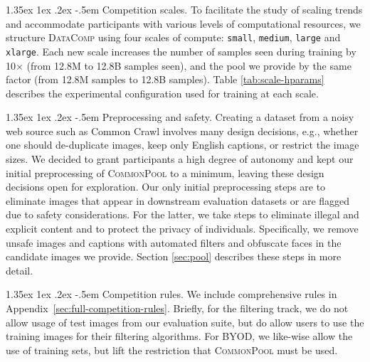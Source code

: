 \documentclass[dvipsnames,11pt]{article}
\makeatletter
\renewcommand\paragraph{\@startsection{paragraph}{4}{\z@}                                     {1.35ex \@plus1ex \@minus.2ex}                                {-.5em}
{\normalfont\normalsize\bfseries}}
\newcommand{\datanet}{\textsc{DataComp}\xspace}
\newcommand{\byod}{\textsc{BYOD}\xspace}
\newcommand{\pool}{\textsc{CommonPool}\xspace}
\makeatother
\begin{document}
\paragraph{Competition scales.} To facilitate the study of scaling trends and accommodate participants with various levels of computational resources, we structure \datanet using four scales of compute: {\small \texttt{small}}, {\small \texttt{medium}}, {\small \texttt{large}} and {\small \texttt{xlarge}}. Each new scale increases the number of samples seen during training by 10$\times$ (from 12.8M to 12.8B samples seen), and the pool we provide by the same factor (from 12.8M samples to 12.8B samples). Table \ref{tab:scale-hparams} describes the experimental configuration used for training at each scale.

\paragraph{Preprocessing and safety.} Creating a dataset from a noisy web source such as Common Crawl involves many design decisions, e.g., whether one should de-duplicate images, keep only English captions, or restrict the image sizes.
We decided to grant participants a high degree of autonomy and kept our initial preprocessing of \pool to a minimum, leaving these design decisions open for exploration. 
Our only initial preprocessing steps are to eliminate images that appear in downstream evaluation datasets or are flagged due to safety considerations.
For the latter, we take steps to eliminate illegal and explicit content and to protect the privacy of individuals.
Specifically, we remove unsafe images and captions with automated filters and obfuscate faces in the candidate images we provide. 
Section \ref{sec:pool} describes these steps in more detail.

\paragraph{Competition rules.} We include comprehensive rules in Appendix~\ref{sec:full-competition-rules}. 
Briefly, for the filtering track, we do not allow usage of test images from our evaluation suite, but do allow users to use the training images for their filtering algorithms.
For \byod, we like-wise allow the use of training sets, but lift the restriction that \pool must be used.
\end{document}
